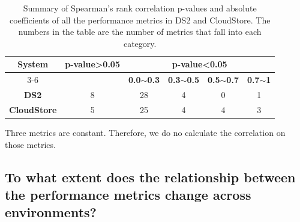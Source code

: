 \documentclass[smallextended]{svjour3}       %
\begin{document}
\begin{table}[tbh]
	\centering
	\caption{Summary of Spearman's rank correlation p-values and absolute coefficients of all the performance metrics in DS2 and CloudStore. The numbers in the table are the number of metrics that fall into each category.}
	\label{tab:correlationall}
	\begin{threeparttable}
		
		\begin{tabular}{|c||c|c|c|c|c|}
			\hline
			\multirow{3}{*}{\textbf{System}} & \multirow{3}{*}{\textbf{p-value\textgreater0.05}} & \multicolumn{4}{c|}{\textbf{p-value\textless0.05}} \\ \cline{3-6} 
			&  & \textbf{0.0$\sim$0.3} & \textbf{0.3$\sim$0.5} & \textbf{0.5$\sim$0.7} & \textbf{0.7$\sim$1} \\ %
			\midrule 
			\midrule 
			\textbf{DS2} & 8 & 28 & 4 & 0 & 1 \\ \hline
			\textbf{CloudStore} & 5 & 25 & 4 & 4 & 3 \\ \hline
		\end{tabular}%
		\begin{tablenotes}
			\item Three metrics are constant. Therefore, we do no calculate the correlation on those metrics.
		\end{tablenotes}
	\end{threeparttable}
	
\end{table}



\subsection{To what extent does the relationship between the performance metrics change across environments?}

\label{sec:relation}
\end{document}

